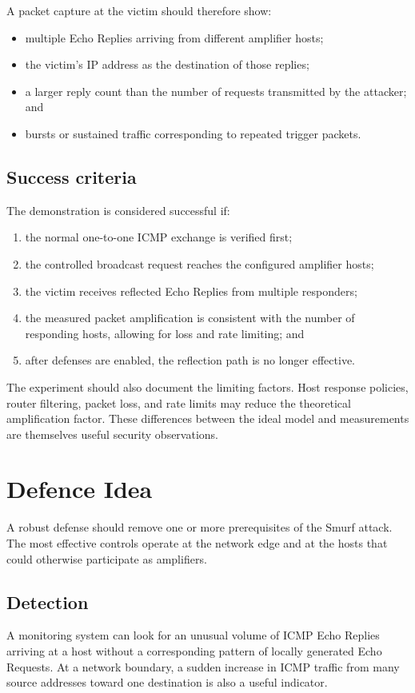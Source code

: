\documentclass[12pt,a4paper]{article}
\begin{document}
A packet capture at the victim should therefore show:
\begin{itemize}
\item multiple Echo Replies arriving from different amplifier hosts;
\item the victim's IP address as the destination of those replies;
\item a larger reply count than the number of requests transmitted by the attacker; and
\item bursts or sustained traffic corresponding to repeated trigger packets.
\end{itemize}

\subsection{Success criteria}
The demonstration is considered successful if:
\begin{enumerate}
\item the normal one-to-one ICMP exchange is verified first;
\item the controlled broadcast request reaches the configured amplifier hosts;
\item the victim receives reflected Echo Replies from multiple responders;
\item the measured packet amplification is consistent with the number of responding hosts, allowing for loss and rate limiting; and
\item after defenses are enabled, the reflection path is no longer effective.
\end{enumerate}

The experiment should also document the limiting factors. Host response policies, router filtering, packet loss, and rate limits may reduce the theoretical amplification factor. These differences between the ideal model and measurements are themselves useful security observations.

\section{Defence Idea}
A robust defense should remove one or more prerequisites of the Smurf attack. The most effective controls operate at the network edge and at the hosts that could otherwise participate as amplifiers.

\subsection{Detection}
A monitoring system can look for an unusual volume of ICMP Echo Replies arriving at a host without a corresponding pattern of locally generated Echo Requests. At a network boundary, a sudden increase in ICMP traffic from many source addresses toward one destination is also a useful indicator.
\end{document}
